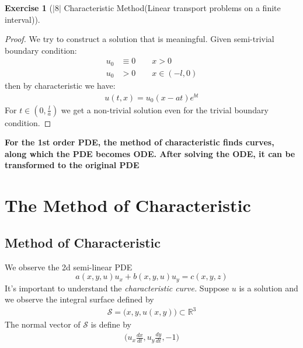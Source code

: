 \documentclass[a4paper,11pt,oneside,fleqn]{book}
\theoremstyle{definition}
\newtheorem{exercise}{Exercise}[chapter]
\theoremstyle{remark}
\begin{document}
\begin{exercise}[$|8|$ Characteristic Method(Linear transport problems on a finite interval)]
\begin{proof}
	We try to construct a solution that is meaningful. Given semi-trivial boundary condition:
	\begin{align*}
		u_0 &\equiv 0 \qquad x >0\\
		u_0 &> 0  \qquad x \in (-l, 0)
	\end{align*}
	then by characteristic we have:
	\begin{align*}
		u(t, x) = u_0(x - at) e^{bt}
	\end{align*}
	For $t \in (0, \frac{l}{a})$ we get a non-trivial solution even for the trivial boundary condition.
\end{proof}
\textbf{For the 1st order PDE, the method of characteristic finds curves, along which the PDE becomes ODE. After solving the ODE, it can be transformed to the original PDE}
\end{exercise}



\section{The Method of Characteristic}


\subsection{Method of Characteristic}
We observe the 2d semi-linear PDE
\begin{equation}
	a(x, y, u)u_x + b(x, y, u)u_y  = c(x, y, z)
\end{equation}
It's important to understand the \textit{characteristic curve.} Suppose $u$ is a solution and we observe the integral surface defined by
\begin{align*}
	\mathcal{S} = \bigg(x, y, u(x, y) \bigg) \subset \mathbb{R}^3
\end{align*}
The normal vector of $\mathcal{S}$ is define by
\begin{align*}
	\bigg(u_x \frac{dx}{dt} , u_y \frac{dy}{dt} , -1\bigg) 
\end{align*}
\end{document}
